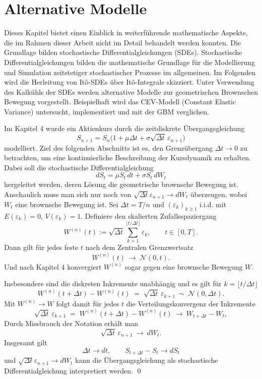 \section{Alternative Modelle}

Dieses Kapitel bietet einen Einblick in weiterführende mathematische Aspekte, die im Rahmen 
dieser Arbeit nicht im Detail behandelt werden konnten.
Die Grundlage bilden stochastische Differentialgleichungen (SDEs).  
Stochastische Differentialgleichungen bilden die mathematische Grundlage für die 
Modellierung und Simulation zeitstetiger stochastischer Prozesse im allgemeinen.
Im Folgenden wird die Herleitung von It\^o-SDEs über It\^o-Integrale skizziert. 
Unter Verwendung des Kalkühls der SDEs werden alternative Modelle zur geometrischen Brownschen Bewegung vorgestellt. 
Beispielhaft wird das CEV-Modell (Constant Elastic Variance) untersucht, implementiert
und mit der GBM verglichen.

\begin{bem}

Im Kapitel 4 wurde ein Aktienkurs durch die zeitdiskrete Übergangsgleichung
$$S_{n+1} = S_n \big(1 + \mu \Delta t + \sigma \sqrt{\Delta t}\,\varepsilon_{n+1}\big)$$
modelliert. Ziel des folgenden Abschnitts ist es, den Grenzübergang $\Delta t \to 0$ zu betrachten,
um eine kontinuierliche Beschreibung der Kursdynamik zu erhalten. Dabei soll die stochastische Differentialgleichung
$$dS_t = \mu S_t\,dt + \sigma S_t\,dW_t$$
hergeleitet werden, deren Lösung die geometrische brownsche Bewegung ist. 
Anschaulich muss man sich nur noch von $\sqrt{\Delta t} \varepsilon_{n+1} \to dW_t$ überzeugen, wobei $W_t$ eine brownsche Bewegung ist.
Sei $\Delta t = T/n$ und $(\varepsilon_k)_{k\ge 1}$ i.i.d. mit $E(\varepsilon_k)=0$, $V(\varepsilon_k)=1$.
Definiere den skalierten Zufallsspaziergang
$$
W^{(n)}(t) := \sqrt{\Delta t}\sum_{k=1}^{\lfloor t/\Delta t\rfloor}\varepsilon_k,\qquad t\in[0,T].
$$
Dann gilt für jedes feste $t$ nach dem Zentralen Grenzwertsatz
$$
W^{(n)}(t)\ \to\ \mathcal N(0,t).
$$
Und nach Kapitel 4 konvergiert $W^{(n)}$ sogar gegen eine brownsche Bewegung $W$.

Insbesondere sind die diskreten Inkremente unabhängig und es gilt für $k=\lfloor t/\Delta t\rfloor$
$$
W^{(n)}(t+\Delta t)-W^{(n)}(t)\;=\;\sqrt{\Delta t}\,\varepsilon_{k+1}\ \sim\ \mathcal N(0,\Delta t).
$$
Mit $W^{(n)}\to W$ folgt damit für jedes $t$ die Verteilungskonvergenz der Inkremente
$$
\sqrt{\Delta t}\,\varepsilon_{k+1}
\;=\;W^{(n)}(t+\Delta t)-W^{(n)}(t)\ \to \ W_{t+\Delta t}-W_t,
$$
Durch Missbrauch der Notation erhält man
$$
\sqrt{\Delta t}\,\varepsilon_{n+1}\ \to\ dW_t.
$$
Insgesamt gilt
$$\Delta t \to dt, \qquad S_{t + \Delta t} - S_t \to dS_t$$
und $\sqrt{\Delta t} \varepsilon_{n+1} \to dW_t$
kann die Übergangsgleichung als stochastische Differentialgleichung interpretiert werden.
\qed

\end{bem}

